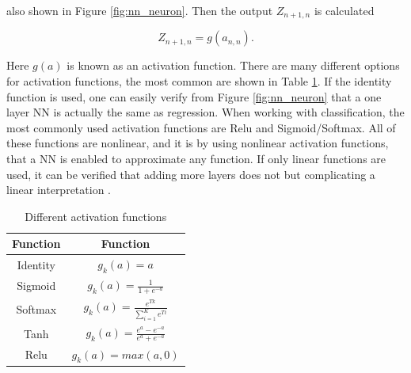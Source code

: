             also shown in Figure \ref{fig:nn_neuron}. Then the output $Z_{n+1,n}$ is calculated 
            
            \begin{equation}
                Z_{n+1,n} = g(a_{n,n}).
                \label{eq:nn_activation}
            \end{equation}
            
            Here $g(a)$ is known as an activation function. There are many different options for activation functions, the most common are shown in Table \ref{tab:acitvations}. If the identity function is used, one can easily verify from Figure \ref{fig:nn_neuron} that a one layer NN is actually the same as regression. When working with classification, the most commonly used activation functions are Relu and Sigmoid/Softmax. All of these functions are nonlinear, and it is by using nonlinear activation functions, that a NN is enabled to approximate any function. If only linear functions are used, it can be verified that adding more layers does not but complicating a linear interpretation \cite{Hastie}. 
            
            
            
        \begin{table}[h]
            \centering
            \begin{tabular}{ | c | c |}
                \hline
                Function & Function\\ \hline
                Identity & $g_k(a) =a$ \\ \hline
                Sigmoid & $g_k(a) =\frac{1}{1+e^{-a}}$ \\ \hline
                Softmax & $g_k(a) =\frac{e^{Tk}}{\sum_{i=1}^Ke^{Ti}}$ \\ \hline
                Tanh & $g_k(a) =\frac{e^a-e^{-a}}{e^a+e^{-a}}$ \\ \hline
                Relu & $g_k(a) =max(a,0)$ \\ \hline
            \end{tabular}
            \caption{Different activation functions}
            \label{tab:acitvations}
        \end{table}
                    

